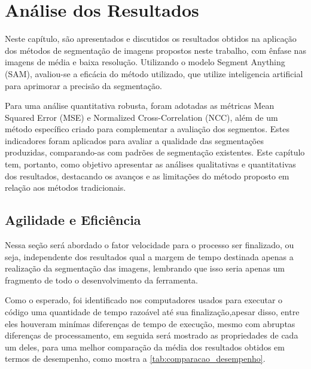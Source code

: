 \chapter{Análise dos Resultados}
\label{cap:04}
Neste capítulo, são apresentados e discutidos os resultados obtidos na aplicação dos métodos de segmentação de imagens propostos neste trabalho, com ênfase nas imagens de média e baixa resolução. Utilizando o modelo Segment Anything (SAM), avaliou-se a eficácia do método utilizado, que utilize inteligencia artificial para aprimorar a precisão da segmentação.

Para uma análise quantitativa robusta, foram adotadas as métricas Mean Squared Error (MSE) e Normalized Cross-Correlation (NCC), além de um método específico criado para complementar a avaliação dos segmentos. Estes indicadores foram aplicados para avaliar a qualidade das segmentações produzidas, comparando-as com padrões de segmentação existentes. Este capítulo tem, portanto, como objetivo apresentar as análises qualitativas e quantitativas dos resultados, destacando os avanços e as limitações do método proposto em relação aos métodos tradicionais.

\section{Agilidade e Eficiência}
Nessa seção será abordado o fator velocidade para o processo ser finalizado, ou seja, independente dos resultados qual a margem de tempo destinada apenas a realização da segmentação das imagens, lembrando que isso seria apenas um fragmento de todo o desenvolvimento da ferramenta.

Como o esperado, foi identificado nos computadores usados para executar o código uma quantidade de tempo razoável até sua finalização,apesar disso, entre eles houveram minímas diferenças de tempo de execução, mesmo com abruptas diferenças de processamento, em seguida será mostrado as propriedades de cada um deles, para uma melhor comparação da média dos resultados obtidos em termos de desempenho, como mostra a \ref{tab:comparacao_desempenho}.

